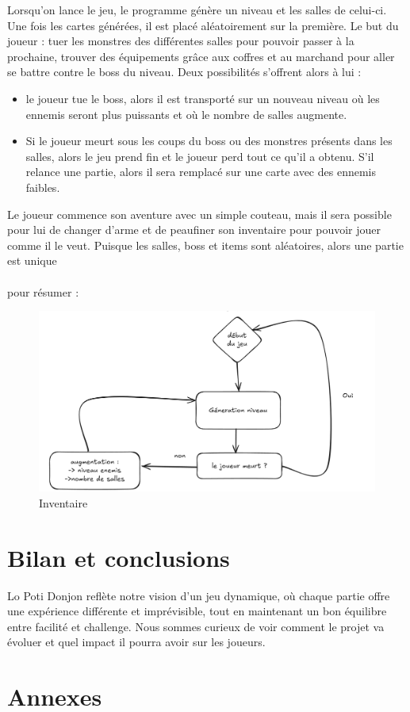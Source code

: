 \documentclass[a4paper,11pt]{article}
\begin{document}
Lorsqu'on lance le jeu, le programme génère un niveau et les salles de celui-ci. 
Une fois les cartes générées, il est placé aléatoirement sur la première. Le but du joueur : tuer les monstres des différentes salles pour pouvoir passer à la prochaine, 
trouver des équipements grâce aux coffres et au marchand pour aller se battre contre le boss du niveau. Deux possibilités s'offrent alors à lui :
\begin{itemize}
    \item le joueur tue le boss, alors il est transporté sur un nouveau niveau où les ennemis seront plus puissants et où le nombre de salles augmente.
    \item Si le joueur meurt sous les coups du boss ou des monstres présents dans les salles, alors le jeu prend fin et le joueur perd tout ce qu'il a obtenu. S'il relance une partie, alors il sera remplacé sur une carte avec des ennemis faibles.
\end{itemize}
Le joueur commence son aventure avec un simple couteau, mais il sera possible pour lui de changer d'arme et de peaufiner son inventaire pour pouvoir jouer comme il le veut. Puisque les salles, boss et items sont aléatoires, alors une partie est unique
\\\\
pour résumer : 
\begin{figure}[ht] 
    \centering 
    \includegraphics[width=0.4\linewidth]{./img/scchemaCycleJeu.png} 
    \caption{Inventaire} 
\end{figure} 

\section{Bilan et conclusions}

Lo Poti Donjon reflète notre vision d'un jeu dynamique, où chaque partie offre une expérience différente et imprévisible, tout en maintenant un bon équilibre entre facilité et challenge. Nous sommes curieux de voir comment le projet va évoluer et quel impact il pourra avoir sur les joueurs.

\section{Annexes}
\end{document}
